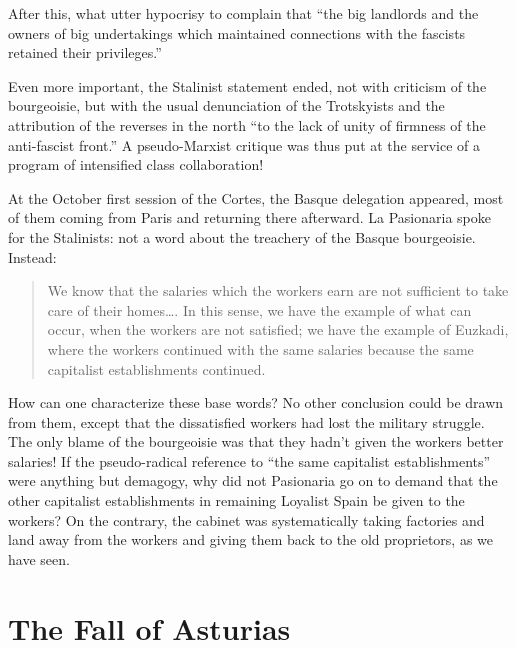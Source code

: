 After this, what utter hypocrisy to complain that ``the big landlords and the owners of big undertakings which maintained connections with the fascists retained their privileges.''

Even more important, the Stalinist statement ended, not with criticism of the bourgeoisie, but with the usual denunciation of the Trotskyists and the attribution of the reverses in the north ``to the lack of unity of firmness of the anti-fascist front.'' A pseudo-Marxist critique was thus put at the service of a program of intensified class collaboration!

At the October first session of the Cortes, the Basque delegation appeared, most of them coming from Paris and returning there afterward. La Pasionaria spoke for the Stalinists: not a word about the treachery of the Basque bourgeoisie. Instead:

\begin{quotation}
  We know that the salaries which the workers earn are not sufficient to take care of their homes\dots. In this sense, we have the example of what can occur, when the workers are not satisfied; we have the example of Euzkadi, where the workers continued with the same salaries because the same capitalist establishments continued.
\end{quotation}

How can one characterize these base words? No other conclusion could be drawn from them, except that the dissatisfied workers had lost the military struggle. The only blame of the bourgeoisie was that they hadn’t given the workers better salaries! If the pseudo-radical reference to ``the same capitalist establishments'' were anything but demagogy, why did not Pasionaria go on to demand that the other capitalist establishments in remaining Loyalist Spain be given to the workers? On the contrary, the cabinet was systematically taking factories and land away from the workers and giving them back to the old proprietors, as we have seen.

\section{The Fall of Asturias}

